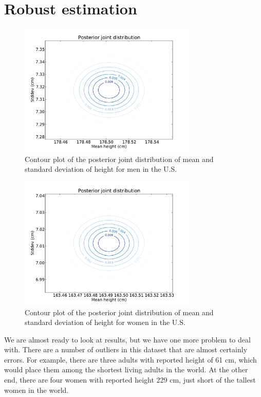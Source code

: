 \documentclass[12pt]{book}
\begin{document}
\section{Robust estimation}

\begin{figure}
\centerline{\includegraphics[height=2.5in]{figs/variability_posterior_male.pdf}}
\caption{Contour plot of the posterior joint distribution of
mean and standard deviation of height for men in the U.S.}
\label{fig.variability1}
\end{figure}

\begin{figure}
\centerline{\includegraphics[height=2.5in]{figs/variability_posterior_female.pdf}}
\caption{Contour plot of the posterior joint distribution of
mean and standard deviation of height for women in the U.S.}
\label{fig.variability2}
\end{figure}

We are almost ready to look at results, but we have one more
problem to deal with.  There are a number of outliers in this
dataset that are almost certainly errors.  For example, there
are three adults with reported height of 61 cm, which would
place them among the shortest living adults in the world.
At the other end, there are four women with reported height
229 cm, just short of the tallest women in the world.
\end{document}
